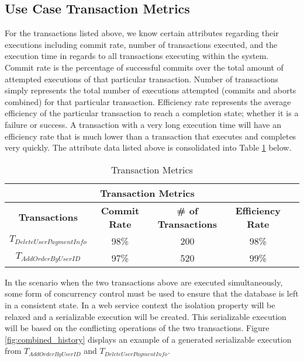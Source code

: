 \documentclass[conference]{IEEEtran}
\begin{document}
\subsection{Use Case Transaction Metrics}

For the transactions listed above, we know certain attributes regarding their executions including commit rate, number of transactions executed, and the execution time in regards to all transactions executing within the system. Commit rate is the percentage of successful commits over the total amount of attempted executions of that particular transaction. Number of transactions simply represents the total number of executions attempted (commits and aborts combined) for that particular transaction. Efficiency rate represents the average efficiency of the particular transaction to reach a completion state; whether it is a failure or success. A transaction with a very long execution time will have an efficiency rate that is much lower than a transaction that executes and completes very quickly. The attribute data listed above is consolidated into Table \ref{tbl:trans_metrics} below. 
\\
\begin{table}[h]
\captionsetup{justification=centering}
\centering
\begin{tabular}{|c|c|c|c|c|}
\hline
\multicolumn{4}{|c|}{\cellcolor[HTML]{EFEFEF}\textbf{Transaction Metrics}}                                                   \\ \hline
\textbf{Transactions} & \textbf{Commit Rate} & \textbf{\# of Transactions} & {\color[HTML]{000000} \textbf{Efficiency Rate}} \\ \hline
$T_{DeleteUserPaymentInfo}$         & 98\%                  & 200                         & 98\%                                          \\ \hline
$T_{AddOrderByUserID}$          & 97\%                     & 520                           & 99\%                                              \\ \hline
\end{tabular}

\caption{Transaction Metrics} %
\label{tbl:trans_metrics} %

\end{table}

In the scenario when the two transactions above are executed simultaneously, some form of concurrency control must be used to ensure that the database is left in a consistent state. In a web service context the isolation property will be relaxed and a serializable execution will be created. This serializable execution will be based on the conflicting operations of the two transactions. Figure \ref{fig:combined_history} displays an example of a generated serializable execution from $T_{AddOrderByUserID}$ and $T_{DeleteUserPaymentInfo}$.
\end{document}
